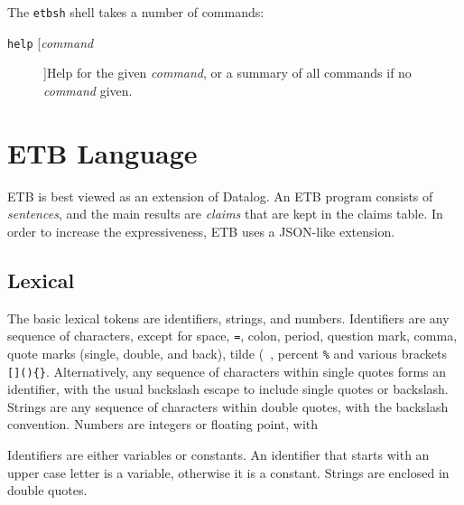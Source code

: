 \documentclass{report}
\begin{document}
The \texttt{etbsh} shell takes a number of commands:
\begin{description}
\item[\texttt{help} [\emph{command}]]{Help for the given \emph{command},
or a summary of all commands if no \emph{command} given.}
\end{description}


\section{ETB Language}
ETB is best viewed as an extension of Datalog.  An ETB program consists of
\emph{sentences}, and the main results are \emph{claims} that are kept in
the claims table.  In order to increase the expressiveness, ETB uses a
JSON-like extension.

\subsection{Lexical}
The basic lexical tokens are identifiers, strings, and numbers.
Identifiers are any sequence of characters, except for space, \texttt{=},
colon, period, question mark, comma, quote marks (single, double, and
back), tilde (\texttt{~}, percent \texttt{\%} and various brackets
\texttt{[]()\{\}}.  Alternatively, any sequence of characters within
single quotes forms an identifier, with the usual backslash escape to
include single quotes or backslash.  Strings are any sequence of
characters within double quotes, with the backslash convention.  Numbers
are integers or floating point, with 

Identifiers are either variables or constants.  An identifier that starts
with an upper case letter is a variable, otherwise it is a constant.
Strings are enclosed in double quotes.





\end{document}
